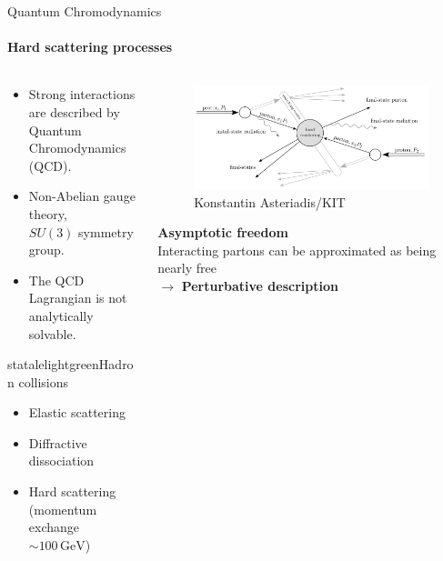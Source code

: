 \begin{frame} {Quantum Chromodynamics}
  \framesubtitle{Hard scattering processes}

   \begin{columns}

    \begin{column}{0.5\textwidth}

    \vspace{0.5em}
    
        \begin{itemize}
            \item Strong interactions are described by Quantum Chromodynamics (QCD).
            \item Non-Abelian gauge theory, \\$SU(3)$ symmetry group.
            \item The QCD Lagrangian is not analytically solvable.
        \end{itemize}

    \vspace{0.5em}
    \begin{colorblock}[black]{statalelightgreen}{Hadron collisions}
        \begin{itemize}
          \item Elastic scattering
          \item Diffractive dissociation
          \item Hard scattering \\(momentum exchange $\sim 100 \,\text{GeV}$)
        \end{itemize}
      \end{colorblock}
    
  
    \end{column}

    \begin{column}{0.5\textwidth}
        \begin{figure}
        \centering
        \includegraphics[width=\textwidth]{imgs/hard-scattering.png}
        \caption{Konstantin Asteriadis/KIT}
      \end{figure}

      \textbf{Asymptotic freedom} \\
      Interacting partons can be approximated as being nearly free\\
      $\to$ \textbf{Perturbative description}
    
    \end{column}

    \end{columns}
  
\end{frame}


